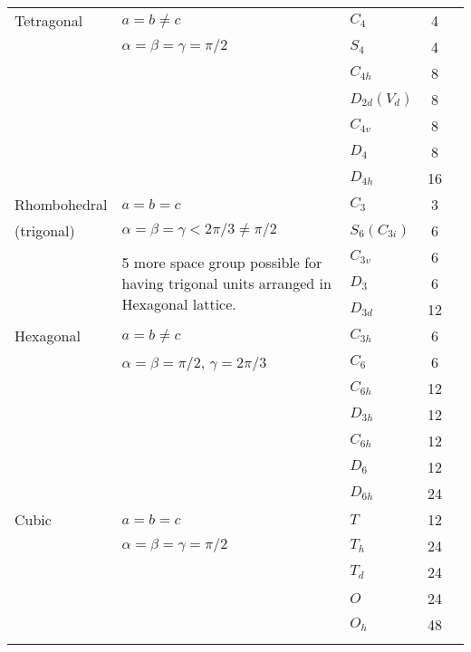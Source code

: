 \begin{landscape}
{\begin{longtable}{l|l|l|c|l}
\hline
Tetragonal & $a=b\neq c$ & $C_{4}$ & 4 & \color{red}{$7\times 2=14$}\\
\color{red}{2 different orientations} & $\alpha=\beta=\gamma=\pi/2$\qquad \color{red}{2} & $S_{4}$ & 4 & \\
                                 & & $C_{4h}$ & 8 & \\
                                 & & $D_{2d}(V_{d})$ & 8 & \\
                                 & & $C_{4v}$ & 8 & \\
                                 & & $D_{4}$ & 8 & \\
                                 & & $D_{4h}$ & 16 & \\
\hline
Rhombohedral & $a=b=c$ & $C_{3}$ & 3 & \color{red}{$5\times 1=5$}\\
(trigonal) & $\alpha=\beta=\gamma<2\pi/3\neq \pi/2$ & $S_{6}(C_{3i})$ & 6 & \\
           & \multirow{3}{5cm}{5 more space group possible for having trigonal units arranged in Hexagonal lattice.\qquad {\color{red}{1}}} & $C_{3v}$ & 6 &\\
            & & $D_{3}$ & 6 &\\
            & & $D_{3d}$ & 12 &\\
\hline
Hexagonal & $a=b\neq c$ & $C_{3h}$ & 6 & {\color{red}{$7\times 1 = 7$}}\\
\color{red}{4 different orientations} & $\alpha=\beta=\pi/2$, $\gamma=2\pi/3$\qquad {\color{red}{1}} & $C_{6}$ & 6\\
 & & $C_{6h}$ & 12 & \\
 & & $D_{3h}$ & 12 & \\
 & & $C_{6h}$ & 12 & \\
 & & $D_{6}$ & 12 & \\
 & & $D_{6h}$ & 24 & \\
\hline
Cubic & $a=b=c$ & $T$ & 12 & {\color{red}{$5\times 3=15$}}\\
      & $\alpha=\beta=\gamma=\pi/2$\qquad {\color{red}{3}} & $T_{h}$ & 24 & \\
&& $T_{d}$ & 24 & \\
&& $O$ & 24 & \\
&& $O_{h}$ & 48 & \\
\hline
\multicolumn{3}{l}{\color{red}{7 additional orientation}} & {\color{red}{Total}} & {\color{red}{61}} \\
\hline
\end{longtable}}\relax
\end{landscape}

